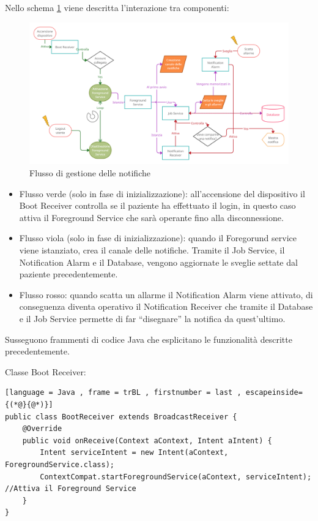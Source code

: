 \documentclass[12pt,a4paper,openright,twoside]{report}
\begin{document}
Nello schema \ref{notifiche} viene descritta l'interazione tra componenti:

\begin{figure}[H]
\begin{center}
\includegraphics[width=1.2\textwidth, keepaspectratio]{img/Diagrammi/Gestione delle notifiche.png}
\caption{Flusso di gestione delle notifiche} \label{notifiche}
\end{center}
\end{figure}

\begin{itemize}
    \item Flusso verde (solo in fase di inizializzazione): all'accensione del dispositivo il Boot Receiver controlla se il paziente ha effettuato il login, in questo caso attiva il Foreground Service che sarà operante fino alla disconnessione.
    \item Flusso viola (solo in fase di inizializzazione): quando il Foregorund service viene istanziato, crea il canale delle notifiche. Tramite il Job Service, il Notification Alarm e il Database, vengono aggiornate le sveglie settate dal paziente precedentemente.
    \item Flusso rosso: quando scatta un allarme il Notification Alarm viene attivato, di conseguenza diventa operativo il Notification Receiver che tramite il Database e il Job Service permette di far ``disegnare'' la notifica da quest'ultimo.
\end{itemize}

Susseguono frammenti di codice Java che esplicitano le funzionalità descritte precedentemente.

Classe Boot Receiver:
\begin{lstlisting}[language = Java , frame = trBL , firstnumber = last , escapeinside={(*@}{@*)}] 
public class BootReceiver extends BroadcastReceiver {
    @Override
    public void onReceive(Context aContext, Intent aIntent) {
        Intent serviceIntent = new Intent(aContext, ForegroundService.class);
        ContextCompat.startForegroundService(aContext, serviceIntent); //Attiva il Foreground Service
    }
}
\end{lstlisting}
\end{document}
